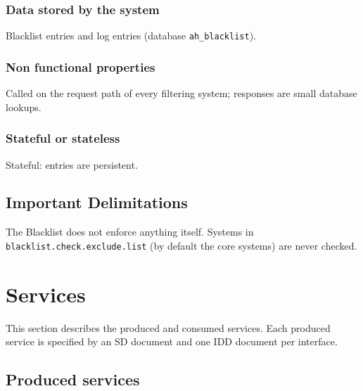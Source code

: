 \documentclass[a4paper]{arrowhead}
\begin{document}
\subsubsection{Data stored by the system}

Blacklist entries and log entries (database \texttt{ah\_\allowbreak{}blacklist}).

\subsubsection{Non functional properties}

Called on the request path of every filtering system; responses are small database lookups.

\subsubsection{Stateful or stateless}

Stateful: entries are persistent.

\subsection{Important Delimitations}
\label{sec:delimitations}

The Blacklist does not enforce anything itself. Systems in \texttt{blacklist.\allowbreak{}check.\allowbreak{}exclude.\allowbreak{}list} (by default the core systems) are never checked.

\newpage

\section{Services}
\label{sec:services}

This section describes the produced and consumed services. Each produced service is specified by an SD document and one IDD document per interface.

\subsection{Produced services}
\end{document}
